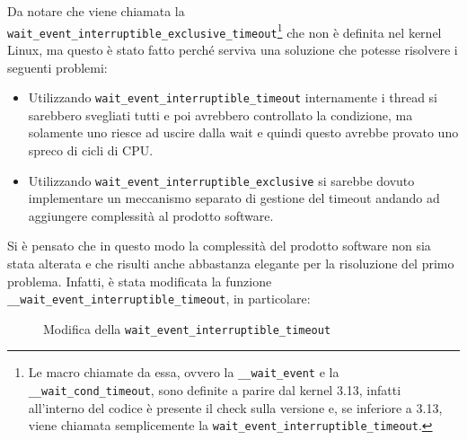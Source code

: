 \documentclass[oneside]{article}
\begin{document}
\begin{itemize}
\begin{itemize}
\begin{enumerate}
Da notare che viene chiamata la \texttt{wait\_event\_interruptible\_exclusive\_timeout}\footnote{Le macro chiamate da essa, ovvero la \texttt{\_\_wait\_event} e la \texttt{\_\_wait\_cond\_timeout}, sono definite a parire dal kernel 3.13, infatti all'interno del codice è presente il check sulla versione e, se inferiore a 3.13, viene chiamata semplicemente la \texttt{wait\_event\_interruptible\_timeout}.} che non è definita nel kernel Linux, ma questo è stato fatto perché serviva una soluzione che potesse risolvere i seguenti problemi:
\begin{itemize}
\item Utilizzando \texttt{wait\_event\_interruptible\_timeout} internamente i thread si sarebbero svegliati tutti e poi avrebbero controllato la condizione, ma solamente uno riesce ad uscire dalla wait e quindi questo avrebbe provato uno spreco di cicli di CPU.
\item Utilizzando \texttt{wait\_event\_interruptible\_exclusive} si sarebbe dovuto implementare un meccanismo separato di gestione del timeout andando ad aggiungere complessità al prodotto software.
\end{itemize}
Si è pensato che in questo modo la complessità del prodotto software non sia stata alterata e che risulti anche abbastanza elegante per la risoluzione del primo problema. Infatti, è stata modificata la funzione \texttt{\_\_wait\_event\_interruptible\_timeout}, in particolare:
\begin{figure}[ht!]
\centering
{}
\caption{Modifica della \texttt{wait\_event\_interruptible\_timeout}}
\label{img:fig-wait}
\end{figure}


\end{enumerate}
\end{itemize}
\end{itemize}
\end{document}

